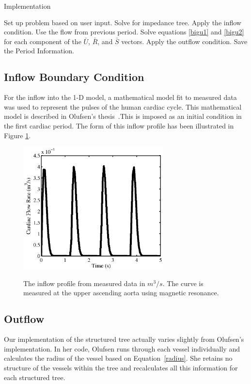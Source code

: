 \documentclass[12pt]{article}
\newcommand{\tensor}[1]{\bar{#1}}
\begin{document}
\begin{algorithm}
\label{alg}
\caption{Implementation}\label{euclid}
\begin{algorithmic}[1]
\State Set up problem based on user input.
\State Solve for impedance tree.
		\State Apply the inflow condition.
	\Else
		\State Use the flow from previous period.
	\EndIf
			\State Solve equations \ref{bigu1} and \ref{bigu2} for each component of the $\tensor{U}$, $\tensor{R}$, and $\tensor{S}$ vectors.
		\EndFor
	\State Apply the outflow condition.
	\EndFor
\State Save the Period Information.
\EndFor
\end{algorithmic}
\end{algorithm}

\subsection{Inflow Boundary Condition}

For the inflow into the 1-D model, a mathematical model fit to measured data was used to represent the pulses of the human cardiac cycle. This mathematical model is described in Olufsen's thesis~\cite{olufsenthesis}.This is imposed as an initial condition in the first cardiac period. The form of this inflow profile has been illustrated in Figure \ref{inflower}.

\begin{figure}[ht]
	\centering
	\includegraphics[width=3in]{inflow}
	\label{inflower}
	\caption{The inflow profile from measured data in $m^3/s$. The curve is measured at the upper ascending aorta using magnetic resonance.}
\end{figure}


\subsection{Outflow}
Our implementation of the structured tree actually varies slightly from Olufsen's implementation. In her code, Olufsen runs through each vessel individually and calculates the radius of the vessel based on Equation~\eqref{radius}. She retains no structure of the vessels within the tree and recalculates all this information for each structured tree.
\end{document}
